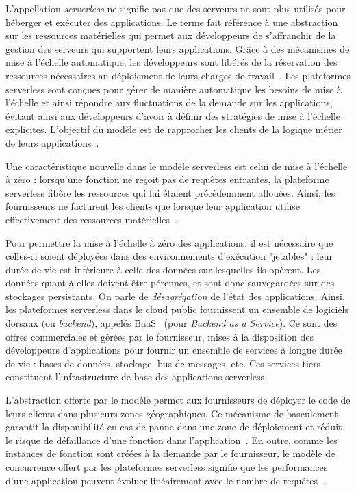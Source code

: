 L'appellation \textit{serverless} ne signifie pas que des serveurs ne sont plus utilisés pour héberger et exécuter des applications. Le terme fait référence à une abstraction sur les ressources matérielles qui permet aux développeurs de s'affranchir de la gestion des serveurs qui supportent leurs applications. Grâce à des mécanismes de mise à l'échelle automatique, les développeurs sont libérés de la réservation des ressources nécessaires au déploiement de leurs charges de travail~\cite{vaneykSPECRGCloud2018}. Les plateformes serverless sont conçues pour gérer de manière automatique les besoins de mise à l'échelle et ainsi répondre aux fluctuations de la demande sur les applications, évitant ainsi aux développeurs d'avoir à définir des stratégies de mise à l'échelle explicites. L'objectif du modèle est de rapprocher les clients de la logique métier de leurs applications~\cite{vaneykSPECRGReferenceArchitecture2019}.

Une caractéristique nouvelle dans le modèle serverless est celui de mise à l'échelle à zéro : lorsqu'une fonction ne reçoit pas de requêtes entrantes, la plateforme serverless libère les ressources qui lui étaient précédemment allouées. Ainsi, les fournisseurs ne facturent les clients que lorsque leur application utilise effectivement des ressources matérielles~\cite{hellersteinServerlessComputingOne2019}.

Pour permettre la mise à l'échelle à zéro des applications, il est nécessaire que celles-ci soient déployées dans des environnements d'exécution "jetables" : leur durée de vie est inférieure à celle des données sur lesquelles ils opèrent. Les données quant à elles doivent être pérennes, et sont donc sauvegardées sur des stockages persistants. On parle de \textit{désagrégation} de l'état des applications. Ainsi, les plateformes serverless dans le cloud public fournissent un ensemble de logiciels dorsaux (ou \textit{backend}), appelés \gls{BaaS}~\cite{mikeroberts2018serverless} (pour \textit{Backend as a Service}). Ce sont des offres commerciales et gérées par le fournisseur, mises à la disposition des développeurs d'applications pour fournir un ensemble de services à longue durée de vie : bases de données, stockage, bus de messages, etc. Ces services tiers constituent l'infrastructure de base des applications serverless.

L'abstraction offerte par le modèle permet aux fournisseurs de déployer le code de leurs clients dans plusieurs zones géographiques. Ce mécanisme de basculement garantit la disponibilité en cas de panne dans une zone de déploiement et réduit le risque de défaillance d'une fonction dans l'application~\cite{taibiPatternsServerlessFunctions2020}. En outre, comme les instances de fonction sont créées à la demande par le fournisseur, le modèle de concurrence offert par les plateformes serverless signifie que les performances d'une application peuvent évoluer linéairement avec le nombre de requêtes~\cite{mcgrathServerlessComputingDesign2017}.

